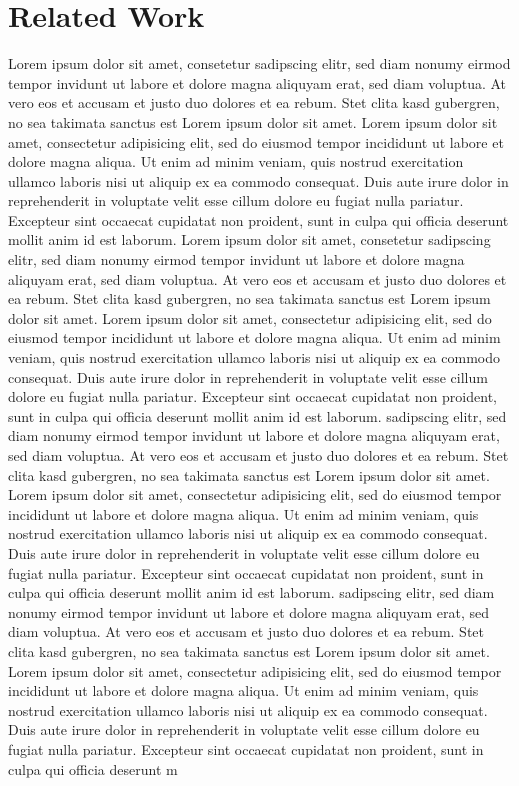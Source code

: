 \documentclass[11pt]{article}
\begin{document}
\section{Related Work}


Lorem ipsum dolor sit amet, consetetur sadipscing elitr, sed diam nonumy eirmod tempor invidunt ut
labore et dolore magna aliquyam erat, sed diam voluptua. At vero eos et accusam et justo duo dolores
et ea rebum. Stet clita kasd gubergren, no sea takimata sanctus est Lorem ipsum dolor sit amet.
Lorem ipsum dolor sit amet, consectetur adipisicing elit, sed do eiusmod tempor incididunt ut labore
et dolore magna aliqua. Ut enim ad minim veniam, quis nostrud exercitation ullamco laboris nisi ut
aliquip ex ea commodo consequat. Duis aute irure dolor in reprehenderit in voluptate velit esse
cillum dolore eu fugiat nulla pariatur. Excepteur sint occaecat cupidatat non proident, sunt in
culpa qui officia deserunt mollit anim id est laborum. Lorem ipsum dolor sit amet, consetetur
sadipscing elitr, sed diam nonumy eirmod tempor invidunt ut labore et dolore magna aliquyam erat,
sed diam voluptua. At vero eos et accusam et justo duo dolores et ea rebum. Stet clita kasd
gubergren, no sea takimata sanctus est Lorem ipsum dolor sit amet. Lorem ipsum dolor sit amet,
consectetur adipisicing elit, sed do eiusmod tempor incididunt ut labore et dolore magna aliqua. Ut
enim ad minim veniam, quis nostrud exercitation ullamco laboris nisi ut aliquip ex ea commodo
consequat. Duis aute irure dolor in reprehenderit in voluptate velit esse cillum dolore eu fugiat
nulla pariatur. Excepteur sint occaecat cupidatat non proident, sunt in culpa qui officia deserunt
mollit anim id est laborum.
sadipscing elitr, sed diam nonumy eirmod tempor invidunt ut labore et dolore magna aliquyam erat,
sed diam voluptua. At vero eos et accusam et justo duo dolores et ea rebum. Stet clita kasd
gubergren, no sea takimata sanctus est Lorem ipsum dolor sit amet. Lorem ipsum dolor sit amet,
consectetur adipisicing elit, sed do eiusmod tempor incididunt ut labore et dolore magna aliqua. Ut
enim ad minim veniam, quis nostrud exercitation ullamco laboris nisi ut aliquip ex ea commodo
consequat. Duis aute irure dolor in reprehenderit in voluptate velit esse cillum dolore eu fugiat
nulla pariatur. Excepteur sint occaecat cupidatat non proident, sunt in culpa qui officia deserunt
mollit anim id est laborum.
sadipscing elitr, sed diam nonumy eirmod tempor invidunt ut labore et dolore magna aliquyam erat,
sed diam voluptua. At vero eos et accusam et justo duo dolores et ea rebum. Stet clita kasd
gubergren, no sea takimata sanctus est Lorem ipsum dolor sit amet. Lorem ipsum dolor sit amet,
consectetur adipisicing elit, sed do eiusmod tempor incididunt ut labore et dolore magna aliqua. Ut
enim ad minim veniam, quis nostrud exercitation ullamco laboris nisi ut aliquip ex ea commodo
consequat. Duis aute irure dolor in reprehenderit in voluptate velit esse cillum dolore eu fugiat
nulla pariatur. Excepteur sint occaecat cupidatat non proident, sunt in culpa qui officia deserunt
m
\end{document}
